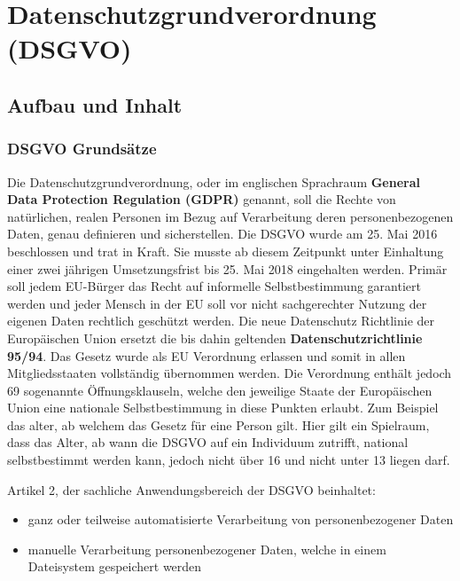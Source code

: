 \chapter{Datenschutzgrundverordnung (DSGVO)}
\putz

\section{Aufbau und Inhalt}
\subsection{DSGVO Grundsätze}
Die Datenschutzgrundverordnung, oder im englischen Sprachraum \textbf{General Data Protection Regulation (GDPR)} genannt, soll die Rechte von natürlichen, realen Personen im Bezug auf Verarbeitung deren personenbezogenen Daten, genau definieren und sicherstellen. Die DSGVO wurde am 25. Mai 2016 beschlossen und trat in Kraft. Sie musste ab diesem Zeitpunkt unter Einhaltung einer zwei jährigen Umsetzungsfrist bis 25. Mai 2018 eingehalten werden. Primär soll jedem EU-Bürger das Recht auf informelle Selbstbestimmung garantiert werden und jeder Mensch in der EU soll vor nicht sachgerechter Nutzung der eigenen Daten rechtlich geschützt werden.
Die neue Datenschutz Richtlinie der Europäischen Union ersetzt die bis dahin geltenden \textbf{Datenschutzrichtlinie 95/94}. Das Gesetz wurde als EU Verordnung erlassen und somit in allen Mitgliedsstaaten vollständig übernommen werden. Die Verordnung enthält jedoch 69 sogenannte Öffnungsklauseln, welche den jeweilige Staate der Europäischen Union eine nationale Selbstbestimmung in diese Punkten erlaubt. Zum Beispiel das alter, ab welchem das Gesetz für eine Person gilt. Hier gilt ein Spielraum, dass das Alter, ab wann die DSGVO auf ein Individuum zutrifft, national selbstbestimmt werden kann, jedoch nicht über 16 und nicht unter 13 liegen darf.

Artikel 2, der sachliche Anwendungsbereich der DSGVO beinhaltet:
\begin{itemize}
	\item ganz oder teilweise automatisierte Verarbeitung von personenbezogener Daten
	\item manuelle Verarbeitung personenbezogener Daten, welche in einem Dateisystem gespeichert werden
\end{itemize}

